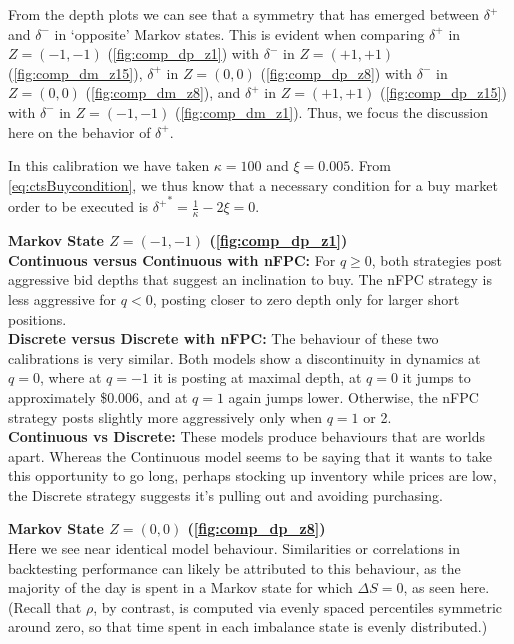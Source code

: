From the depth plots we can see that a symmetry that has emerged between $\delta^+$ and $\delta^-$ in `opposite' Markov states. This is evident when comparing $\delta^+$ in $Z=(-1,-1)$ (\autoref{fig:comp_dp_z1}) with $\delta^-$ in $Z=(+1,+1)$ (\autoref{fig:comp_dm_z15}), $\delta^+$ in $Z=(0,0)$ (\autoref{fig:comp_dp_z8}) with $\delta^-$ in $Z=(0,0)$ (\autoref{fig:comp_dm_z8}), and $\delta^+$ in $Z=(+1,+1)$ (\autoref{fig:comp_dp_z15}) with $\delta^-$ in $Z=(-1,-1)$ (\autoref{fig:comp_dm_z1}). Thus, we focus the discussion here on the behavior of $\delta^+$.

In this calibration we have taken $\kappa=100$ and $\xi = 0.005$. From \eqref{eq:ctsBuycondition}, we thus know that a necessary condition for a buy market order to be executed is ${\delta^+}^* =  \frac{1}{\kappa} - 2 \xi = 0$.

{\bf Markov State $Z=(-1,-1)$ (\autoref{fig:comp_dp_z1})} \\
{\bf Continuous versus Continuous with nFPC:} For $q \geq 0$, both strategies post aggressive bid depths that suggest an inclination to buy. The nFPC strategy is less aggressive for $q<0$, posting closer to zero depth only for larger short positions.  \\
{\bf Discrete versus Discrete with nFPC:} The behaviour of these two calibrations is very similar. Both models show a discontinuity in dynamics at $q=0$, where at $q=-1$ it is posting at maximal depth, at $q=0$ it jumps to approximately \$0.006, and at $q=1$ again jumps lower. Otherwise, the nFPC strategy posts slightly more aggressively only when $q=1$ or 2. \\
{\bf Continuous vs Discrete:} These models produce behaviours that are worlds apart. Whereas the Continuous model seems to be saying that it wants to take this opportunity to go long, perhaps stocking up inventory while prices are low, the Discrete strategy suggests it's pulling out and avoiding purchasing. 

{\bf Markov State $Z=(0,0)$ (\autoref{fig:comp_dp_z8})}\\
Here we see near identical model behaviour. Similarities or correlations in backtesting performance can likely be attributed to this behaviour, as the majority of the day is spent in a Markov state for which $\Delta S = 0$, as seen here. (Recall that $\rho$, by contrast, is computed via evenly spaced percentiles symmetric around zero, so that time spent in each imbalance state is evenly distributed.)

